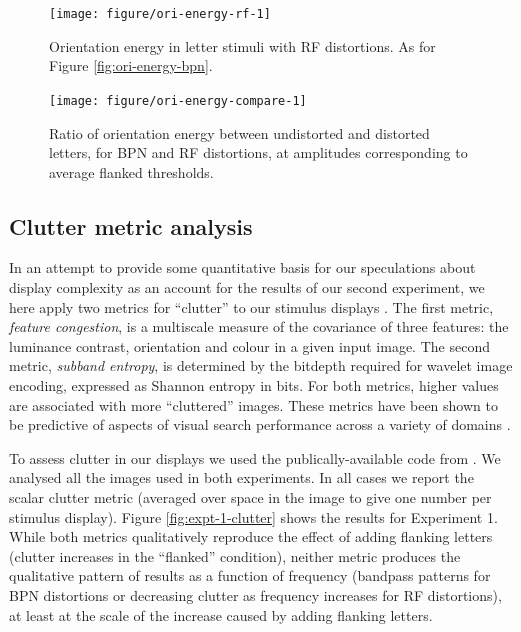 \documentclass[doc, 11pt,a4paper,natbib]{apa6}\usepackage[]{graphicx}\usepackage[]{color}
\newenvironment{knitrout}{}{} %
\begin{document}
\begin{knitrout}
\color{fgcolor}\begin{figure}
\texttt{[image: figure/ori-energy-rf-1]} \caption{Orientation energy in letter stimuli with RF distortions.
              As for Figure \ref{fig:ori-energy-bpn}.}\label{fig:ori-energy-rf}
\end{figure}


\end{knitrout}



\begin{knitrout}
\color{fgcolor}\begin{figure}
\texttt{[image: figure/ori-energy-compare-1]} \caption[Ratio of orientation energy between undistorted and distorted letters,
               for BPN and RF distortions, at amplitudes corresponding to average flanked thresholds]{Ratio of orientation energy between undistorted and distorted letters,
               for BPN and RF distortions, at amplitudes corresponding to average flanked thresholds.}\label{fig:ori-energy-compare}
\end{figure}


\end{knitrout}

\subsection{Clutter metric analysis}

In an attempt to provide some quantitative basis for our speculations about display complexity as an account for the results of our second experiment, we here apply two metrics for ``clutter'' to our stimulus displays \citep{rosenholtz_measuring_2007}.
The first metric, \textit{feature congestion}, is a multiscale measure of the covariance of three features: the luminance contrast, orientation and colour in a given input image.
The second metric, \textit{subband entropy}, is determined by the bitdepth required for wavelet image encoding, expressed as Shannon entropy in bits.
For both metrics, higher values are associated with more ``cluttered'' images.
These metrics have been shown to be predictive of aspects of visual search performance across a variety of domains \citep{asher_regional_2013, henderson_influence_2009, rosenholtz_measuring_2007}.

To assess clutter in our displays we used the publically-available code from \citet[][see \url{https://dspace.mit.edu/handle/1721.1/37593}]{rosenholtz_measuring_2007}.
We analysed all the images used in both experiments.
In all cases we report the scalar clutter metric (averaged over space in the image to give one number per stimulus display).
Figure \ref{fig:expt-1-clutter} shows the results for Experiment 1.
While both metrics qualitatively reproduce the effect of adding flanking letters (clutter increases in the ``flanked'' condition), neither metric produces the qualitative pattern of results as a function of frequency (bandpass patterns for BPN distortions or decreasing clutter as frequency increases for RF distortions), at least at the scale of the increase caused by adding flanking letters.
\end{document}

